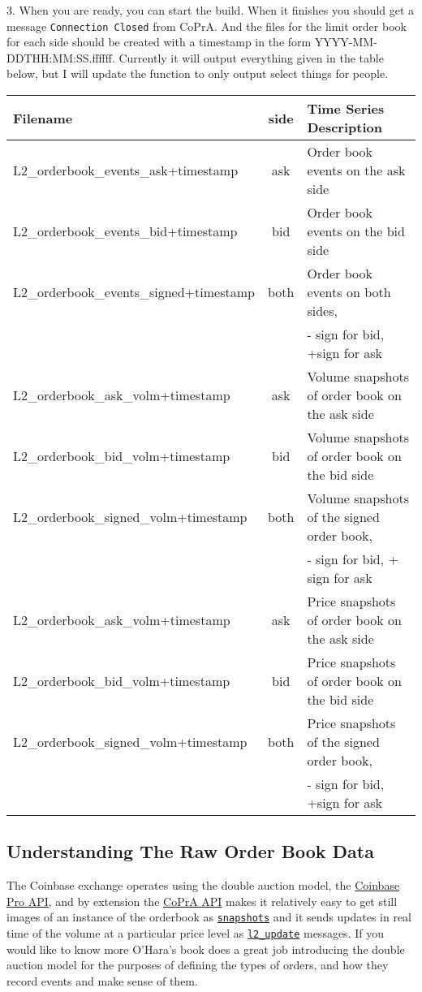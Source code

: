 3. When you are ready, you can start the build. When it finishes you should get a message \texttt{Connection Closed} from CoPrA. And the files for the limit order book for each side should be created with a timestamp in the form YYYY-MM-DDTHH:MM:SS.ffffff. Currently it will output everything given in the table below, but I will update the function to only output select things for people.
\begin{center}
\begin{tabular}{|l|c|l|}
	\hline
	Filename & side & Time Series Description \\
	\hline 
	L2\_orderbook\_events\_ask+timestamp& ask& Order book events on the ask side\\
	L2\_orderbook\_events\_bid+timestamp&bid& Order book events on the bid side \\
	L2\_orderbook\_events\_signed+timestamp& both & Order book events on both sides,\\
	&& - sign for bid, +sign for ask\\
	L2\_orderbook\_ask\_volm+timestamp& ask &Volume snapshots of order book on the ask side \\
	L2\_orderbook\_bid\_volm+timestamp& bid &Volume snapshots of order book on the bid side \\
	L2\_orderbook\_signed\_volm+timestamp & both &Volume  snapshots of the signed order book,\\
	&&- sign for bid, + sign for ask\\
	L2\_orderbook\_ask\_volm+timestamp& ask &Price snapshots of order book on the ask side \\
	L2\_orderbook\_bid\_volm+timestamp& bid &Price snapshots of order book on the bid side \\
	L2\_orderbook\_signed\_volm+timestamp& both &Price snapshots of the signed order book,\\
	&& - sign for bid, +sign for ask\\
	\hline
\end{tabular}
\end{center}

\subsection{Understanding The Raw Order Book Data}

The Coinbase exchange operates using the double auction model, the \href{https://docs.pro.coinbase.com/}{Coinbase Pro API}, and by extension the \href{https://copra.readthedocs.io/en/latest/}{CoPrA API} makes it relatively easy to get still images of an instance of the orderbook as \href{(https://docs.pro.coinbase.com/#the-level2-channel)}{\texttt{snapshots}} and it sends updates in real time of the volume at a particular price level as \href{https://docs.pro.coinbase.com/#the-level2-channel}{\texttt{l2\_update}} messages. If you would like to know more O'Hara's book\cite{Ohara:MMTheory} does a great job introducing the double auction model for the purposes of defining the types of orders, and how they record events and make sense of them. 

